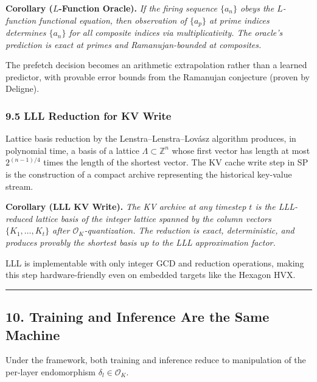 \documentclass[
  11pt,
]{article}
\begin{document}
\textbf{Corollary (\(L\)-Function Oracle).} \emph{If the firing sequence
\(\{a_n\}\) obeys the \(L\)-function functional equation, then
observation of \(\{a_p\}\) at prime indices determines \(\{a_n\}\) for
all composite indices via multiplicativity. The oracle's prediction is
exact at primes and Ramanujan-bounded at composites.}

The prefetch decision becomes an arithmetic extrapolation rather than a
learned predictor, with provable error bounds from the Ramanujan
conjecture (proven by Deligne).

\hypertarget{lll-reduction-for-kv-write}{%
\subsubsection{9.5 LLL Reduction for KV
Write}\label{lll-reduction-for-kv-write}}

Lattice basis reduction by the Lenstra--Lenstra--Lovász algorithm
produces, in polynomial time, a basis of a lattice
\(\Lambda \subset \mathbb{Z}^n\) whose first vector has length at most
\(2^{(n-1)/4}\) times the length of the shortest vector. The KV cache
write step in SP is the construction of a compact archive representing
the historical key-value stream.

\textbf{Corollary (LLL KV Write).} \emph{The KV archive at any timestep
\(t\) is the LLL-reduced lattice basis of the integer lattice spanned by
the column vectors \(\{K_1, \dots, K_t\}\) after
\(\mathcal{O}_K\)-quantization. The reduction is exact, deterministic,
and produces provably the shortest basis up to the LLL approximation
factor.}

LLL is implementable with only integer GCD and reduction operations,
making this step hardware-friendly even on embedded targets like the
Hexagon HVX.

\begin{center}\rule{0.5\linewidth}{0.5pt}\end{center}

\hypertarget{training-and-inference-are-the-same-machine}{%
\subsection{10. Training and Inference Are the Same
Machine}\label{training-and-inference-are-the-same-machine}}

Under the framework, both training and inference reduce to manipulation
of the per-layer endomorphism \(\delta_l \in \mathcal{O}_K\).
\end{document}
